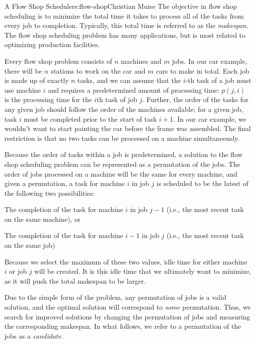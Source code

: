 \begin{aosachapter}{A Flow Shop Scheduler}{s:flow-shop}{Christian Muise}
The objective in flow shop scheduling is to minimize the total time it
takes to process all of the tasks from every job to completion.
Typically, this total time is referred to as the \emph{makespan}. The
flow shop scheduling problem has many applications, but is most related
to optimizing production facilities.

Every flow shop problem consists of $n$ machines and $m$ jobs. In our
car example, there will be $n$ stations to work on the car and $m$ cars
to make in total. Each job is made up of exactly $n$ tasks, and we can
assume that the $i$-th task of a job must use machine $i$ and requires a
predetermined amount of processing time: $p(j,i)$ is the processing time
for the $i$th task of job $j$. Further, the order of the tasks for any
given job should follow the order of the machines available; for a given
job, task $i$ must be completed prior to the start of task $i+1$. In our
car example, we wouldn't want to start painting the car before the frame
was assembled. The final restriction is that no two tasks can be
processed on a machine simultaneously.

Because the order of tasks within a job is predetermined, a solution to
the flow shop scheduling problem can be represented as a permutation of
the jobs. The order of jobs processed on a machine will be the same for
every machine, and given a permutation, a task for machine $i$ in job
$j$ is scheduled to be the latest of the following two possibilities:

\begin{aosaenumerate}
\def\labelenumi{\arabic{enumi}.}
\item
  The completion of the task for machine $i$ in job $j-1$ (i.e., the
  most recent task on the same machine), or
\item
  The completion of the task for machine $i-1$ in job $j$ (i.e., the
  most recent task on the same job)
\end{aosaenumerate}

Because we select the maximum of these two values, idle time for either
machine $i$ or job $j$ will be created. It is this idle time that we
ultimately want to minimize, as it will push the total makespan to be
larger.

Due to the simple form of the problem, any permutation of jobs is a
valid solution, and the optimal solution will correspond to \emph{some}
permutation. Thus, we search for improved solutions by changing the
permutation of jobs and measuring the corresponding makespan. In what
follows, we refer to a permutation of the jobs as a \emph{candidate}.


\end{aosachapter}
